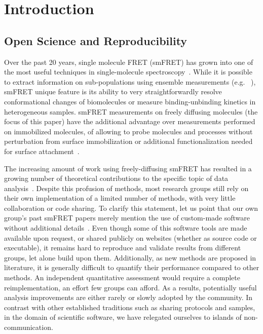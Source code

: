 \section{Introduction}

\subsection{Open Science and Reproducibility}

Over the past 20 years, single molecule FRET (smFRET) has grown into one of the most
useful techniques in single-molecule spectroscopy~\cite{Weiss_1999,Hohlbein_2014}.
While it is possible to extract information on sub-populations using ensemble measurements (e.g. ~\cite{Lerner_2014,Rahamim_2015}),
smFRET unique feature is its ability to very straightforwardly resolve conformational
changes of biomolecules or measure binding-unbinding kinetics in heterogeneous samples.
smFRET measurements on freely diffusing molecules (the focus of this paper) have the additional advantage over measurements performed on immobilized molecules, of allowing to probe molecules and processes without perturbation from surface
immobilization or additional functionalization needed for surface attachment~\cite{Dahan_1999,Eggeling_1998}.

The increasing amount of work using freely-diffusing smFRET has resulted in a growing number of theoretical contributions to the specific topic of data analysis~\cite{Fries_1998,Eggeling_2001,Zhang_2005,Gopich_2005,Lee_2005,Nir_2006,Antonik2006,Gopich_2007,Gopich_2008,Camley_2009,Santoso_2010,Torella_2011,Tomov_2012}. Despite this profusion of methods, most research groups still rely on their own implementation of a limited number of methods, with very little collaboration or code sharing. To clarify this statement, let us point that our own group's past smFRET papers merely mention the use of custom-made software without
additional details~\cite{Lee_2005,Nir_2006}. Even though some of this software tools are made available upon request, or shared publicly on websites (whether as source code or executable), it remains hard to reproduce and validate results from different groups, let alone build upon them. 
Additionally, as new methods are proposed in literature,
it is generally difficult to quantify their performance compared to other methods.
An independent quantitative assessment
would require a complete reimplementation, an effort few groups can afford.
As a results, potentially useful analysis improvements
are either rarely or slowly adopted by the community.
In contrast with other established traditions such as
sharing protocols and samples, in the domain of scientific software,
we have relegated ourselves to islands of non-communication.


